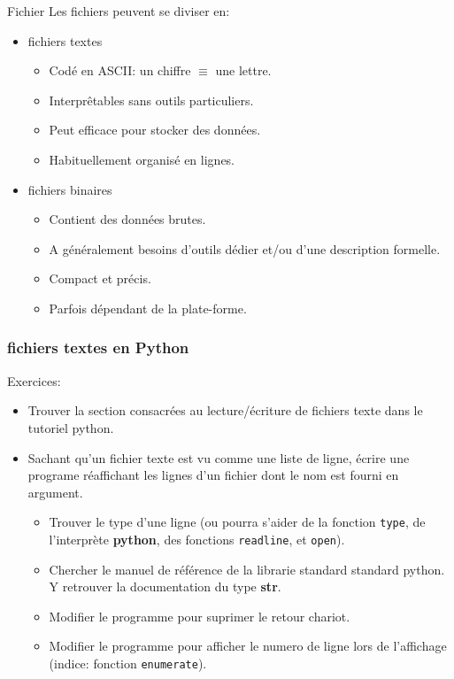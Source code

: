 \documentclass{beamer}
\begin{document}
\begin{frame}{Fichier}
  Les fichiers peuvent se diviser en:
  \begin{itemize}
    \item fichiers textes
      \begin{itemize}
      \item Codé en ASCII: un chiffre $\equiv$ une lettre.
      \item Interprêtables sans outils particuliers.
      \item Peut efficace pour stocker des données.
      \item Habituellement organisé en lignes.
      \end{itemize}
    \item fichiers binaires
      \begin{itemize}
      \item Contient des données brutes.
      \item A généralement besoins d'outils dédier et/ou d'une description formelle.
      \item Compact et précis.
      \item Parfois dépendant de la plate-forme.
      \end{itemize}
  \end{itemize}
\end{frame}

\begin{frame}[fragile]\frametitle{fichiers textes en Python}
  Exercices:
  \begin{itemize}
  \item Trouver la section consacrées au lecture/écriture de fichiers texte dans le tutoriel python.
  \item Sachant qu'un fichier texte est vu comme une liste de ligne, écrire une programe réaffichant les lignes d'un fichier dont le nom est fourni en argument.
    \begin{itemize}
    \item Trouver le type d'une ligne (ou pourra s'aider de la fonction {\tt type}, de l'interprète {\bf python}, des fonctions {\tt readline}, et {\tt open}).
    \item Chercher le manuel de référence de la librarie standard standard python. Y retrouver la documentation du type {\bf str}.
    \item Modifier le programme pour suprimer le retour chariot.
    \item Modifier le programme pour afficher le numero de ligne lors de l'affichage (indice: fonction {\tt enumerate}).
    \end{itemize}
  \end{itemize}
\end{frame}
\end{document}
